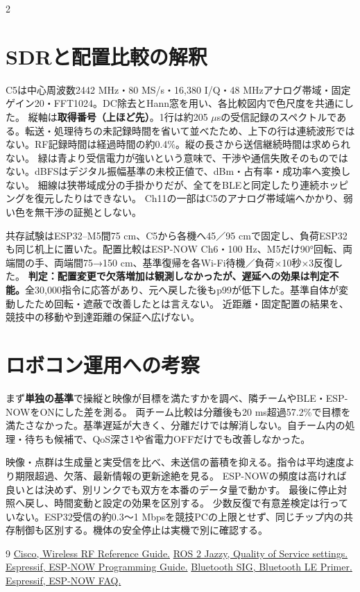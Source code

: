 \documentclass[a4paper,twocolumn,10pt]{ltjsarticle}
\begin{document}
\begin{multicols}{2}
\columnbreak
\section{SDRと配置比較の解釈}
C5は中心周波数2442 MHz・80 MS/s・16,380 I/Q・48 MHzアナログ帯域・固定ゲイン20・FFT1024。DC除去とHann窓を用い、各比較図内で色尺度を共通にした。
縦軸は\textbf{取得番号（上ほど先）}。1行は約205 $\mu$sの受信記録のスペクトルである。転送・処理待ちの未記録時間を省いて並べたため、上下の行は連続波形ではない。RF記録時間は経過時間の約0.4\%。縦の長さから送信継続時間は求められない。
緑は青より受信電力が強いという意味で、干渉や通信失敗そのものではない。dBFSはデジタル振幅基準の未校正値で、dBm・占有率・成功率へ変換しない。
細線は狭帯域成分の手掛かりだが、全てをBLEと同定したり連続ホッピングを復元したりはできない。
Ch11の一部はC5のアナログ帯域端へかかり、弱い色を無干渉の証拠としない。

共存試験はESP32--M5間75 cm、C5から各機へ45／95 cmで固定し、負荷ESP32も同じ机上に置いた。配置比較はESP-NOW Ch6・100 Hz、M5だけ90°回転、両端間の手、両端間75→150 cm、基準復帰を各Wi-Fi待機／負荷×10秒×3反復した。
\textbf{判定：配置変更で欠落増加は観測しなかったが、遅延への効果は判定不能。}全30,000指令に応答があり、元へ戻した後もp99が低下した。基準自体が変動したため回転・遮蔽で改善したとは言えない。
近距離・固定配置の結果を、競技中の移動や到達距離の保証へ広げない。

\section{ロボコン運用への考察}
まず\textbf{単独の基準}で操縦と映像が目標を満たすかを調べ、隣チームやBLE・ESP-NOWをONにした差を測る。
両チーム比較は分離後も20 ms超過57.2\%で目標を満たさなかった。基準遅延が大きく、分離だけでは解消しない。自チーム内の処理・待ちも候補で、QoS深さ1や省電力OFFだけでも改善しなかった。

映像・点群は生成量と実受信を比べ、未送信の蓄積を抑える。指令は平均速度より期限超過、欠落、最新情報の更新途絶を見る。
ESP-NOWの頻度は高ければ良いとは決めず、別リンクでも双方を本番のデータ量で動かす。
最後に停止対照へ戻し、時間変動と設定の効果を区別する。
少数反復で有意差検定は行っていない。ESP32受信の約0.3〜1 Mbpsを競技PCの上限とせず、同じチップ内の共存制御も区別する。機体の安全停止は実機で別に確認する。

{\footnotesize\begin{thebibliography}{9}\footnotesize
{} \href{https://www.cisco.com/c/en/us/td/docs/wireless/controller/9800/technical-reference/wireless-rf-reference-guide.html}{Cisco, Wireless RF Reference Guide.}
 \href{https://docs.ros.org/en/jazzy/Concepts/Intermediate/About-Quality-of-Service-Settings.html}{ROS 2 Jazzy, Quality of Service settings.}
 \href{https://docs.espressif.com/projects/esp-idf/en/v6.0/esp32/api-reference/network/esp_now.html}{Espressif, ESP-NOW Programming Guide.}
 \href{https://www.bluetooth.com/bluetooth-le-primer/}{Bluetooth SIG, Bluetooth LE Primer.}
 \href{https://docs.espressif.com/projects/esp-faq/en/latest/application-solution/esp-now.html}{Espressif, ESP-NOW FAQ.}
\end{thebibliography}}
\end{multicols}
\end{document}
